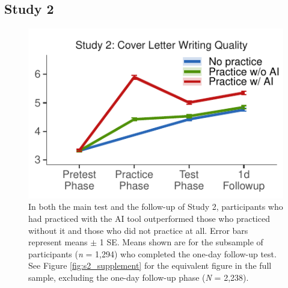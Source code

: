\documentclass[11pt]{report}
\begin{document}
\begin{mainf}
\section*{Study 2} 

\begin{figure}[t]
    \centering
    \includegraphics[width=1\linewidth]{mainfig.pdf}
    \caption{In both the main test and the follow-up of Study 2, participants who had practiced with the AI tool outperformed those who practiced without it and those who did not practice at all.
    Error bars represent means $\pm$ 1 SE.
    Means shown are for the subsample of participants (\textit{n} = 1,294) who completed the one-day follow-up test. See Figure \ref{fig:s2_supplement} for the equivalent figure in the full sample, excluding the one-day follow-up phase (\textit{N} = 2,238).}
    \label{fig:difs}
\end{figure}


\end{mainf}
\end{document}
